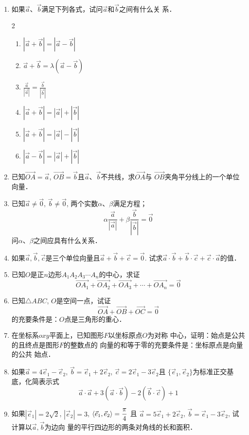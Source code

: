\begin{enumerate}
    \item 如果$\vec{a}$、$\vec{b}$满足下列各式，试问$\vec{a}$和$\vec{b}$之间有什么关
    系．
\begin{multicols}{2}
\begin{enumerate}
    \item $\left|\vec{a}+\vec{b}\right|=\left|\vec{a}-\vec{b}\right|$
    \item $\vec{a}+\vec{b}=\lambda\left(\vec{a}-\vec{b}\right)$
    \item $\frac{\vec{a}}{\left|\vec{a}\right|}=\frac{\vec{b}}{\left|\vec{b}\right|}$
    \item $\left|\vec{a}+\vec{b}\right|=\left|\vec{a}\right|+\left|\vec{b}\right|$
    \item $\left|\vec{a}+\vec{b}\right|=\left|\vec{a}\right|-\left|\vec{b}\right|$
    \item $\left|\vec{a}-\vec{b}\right|=\left|\vec{a}\right|+\left|\vec{b}\right|$
\end{enumerate}
\end{multicols}

\item 已知$\Vec{OA}=\vec{a}$, $\Vec{OB}=\vec{b}$且$\vec{a}$、$\vec{b}$不共线，求$\Vec{OA}$与
$\Vec{OB}$夹角平分线上的一个单位向量．
\item 已知$\vec{a}\ne \vec{0}$, $\vec{b}\ne\vec{0}$, 两个实数$\alpha$、$\beta$满足方程；
\[\alpha\frac{\vec{a}}{|\vec{a}|}+\beta\frac{\vec{b}}{|\vec{b}|}=\vec{0}\]
问$\alpha$、$\beta$之间应具有什么关系．

\item 如果$\vec{a},\vec{b},\vec{c}$是三个单位向量且$\vec{a}+\vec{b}+\vec{c}=\vec{0}$. 
试求$\vec{a}\cdot \vec{b}+\vec{b}\cdot \vec{c}+\vec{c}\cdot \vec{a}$的值．

\item 已知$O$是正$n$边形$A_1A_2A_3\cdots A_n$的中心，求证
\[\Vec{OA_1}+\Vec{OA_2}+\Vec{OA_3}+\cdots+\Vec{OA_n}=\vec{0}\]
\item 已知$\triangle ABC$, $O$是空间一点，试证
\[\Vec{OA}+\Vec{OB}+\Vec{OC}=\vec{0}\]
的充要条件是：$O$点是三角形的重心．
\item 在坐标系$oxy$平面上，已知图形$F$以坐标原点$O$为对称
中心，证明：始点是公共的且终点是图形$F$的整数点的
向量的和等于零的充要条件是：坐标原点是向量的公共
始点．

\item 如果$\vec{a}=4\vec{e}_1-\vec{e}_2$, $\vec{b}=\vec{e}_1+2\vec{e}_2$, $\vec{c}=2\vec{e}_1-3\vec{e}_2$且
$\{\vec{e}_1,\vec{e}_2\}$为标准正交基底，化简表示式
\[\vec{a}\cdot \vec{a}+3(\vec{a}\cdot \vec{b})-2(\vec{b}\cdot \vec{c})+1\]
\item 如果$|\vec{e}_1|=2\sqrt{2}$, $|\vec{e}_2|=3$, $\left\langle \vec{e}_1,\vec{e}_2 \right\rangle=\dfrac{\pi}{4}$
且
$\vec{a}=5\vec{e}_1+2\vec{e}_2$, $\vec{b}=\vec{e}_1-3\vec{e}_2$, 试计算以$\vec{a},\vec{b}$为边向
量的平行四边形的两条对角线的长和面积．



\end{enumerate}
